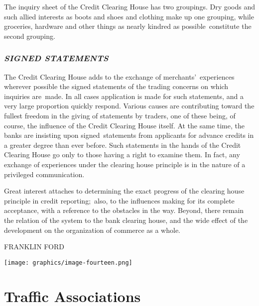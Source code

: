 \documentclass[openany,nobib]{tufte-book}
\let\oldchapter\chapter
\def\chapter{%
  \setcounter{footnote}{0}%
  \oldchapter
}
\begin{document}
The inquiry sheet of the Credit Clearing House has two groupings. Dry
goods and such allied interests as boots and shoes and clothing make up
one grouping, while groceries, hardware and other things as nearly
kindred as possible~constitute the second grouping.~

\hypertarget{signed-statements}{%
\subsection{\texorpdfstring{\emph{SIGNED
STATEMENTS}}{SIGNED STATEMENTS}}\label{signed-statements}}

The Credit Clearing House adds to the exchange of merchants'~experiences
wherever possible the signed statements of the trading concerns on which
inquiries are~made. In all cases application is made for such
statements, and a very large proportion quickly respond. Various causes
are contributing toward the fullest freedom in the giving of statements
by traders, one of these being, of course, the influence of the Credit
Clearing House itself. At the same time, the banks are insisting upon
signed~statements from applicants for advance credits in a greater
degree than ever before. Such statements in the hands of the Credit
Clearing House go only to those having a right to examine them. In fact,
any exchange of experiences under the clearing house principle is in the
nature of a privileged communication.~

Great interest attaches to determining the exact progress of the
clearing house principle in credit reporting;~also, to the influences
making for its complete acceptance, with a reference to the obstacles in
the way. Beyond, there remain the relation of the system to the bank
clearing house, and the wide effect of the development on the
organization of commerce as a whole.~

\vspace{0.2in}

\hfill FRANKLIN FORD

\begin{figure*}
    \centering
    \texttt{[image: graphics/image-fourteen.png]}
    \label{fig:fig14}
\end{figure*}



\chapter[Traffic Associations]{Traffic Associations}
\label{ch:Traffic Associations}
\end{document}
